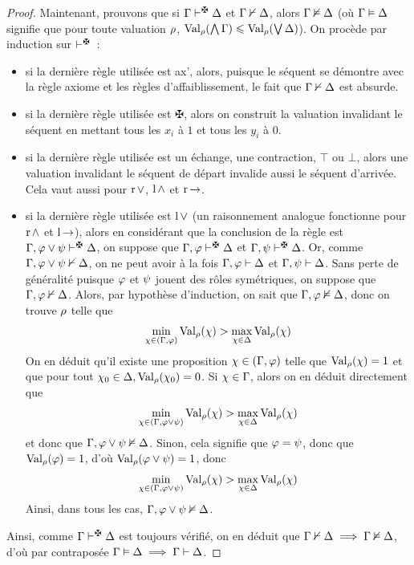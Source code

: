 \begin{proof}
  \noindent
  Maintenant, prouvons que si $\varCG\vdAbs\varCD$ et $\Gamma\nvdash\Delta$,
  alors $\Gamma\nvDash\Delta$ (où $\Gamma\vDash \Delta$ signifie que pour toute
  valuation
  $\rho$, $\operatorname{Val}_{\rho}(\bigwedge \Gamma) \leqslant \operatorname{Val}_{\rho}(\bigvee \Delta)$).
  On procède par induction sur $\vdAbs$~:
  \begin{itemize}
  \item si la dernière règle utilisée est ax', alors, puisque le séquent se
    démontre avec la règle axiome et les règles d'affaiblissement, le fait que
    $\Gamma\nvdash \Delta$ est absurde.
  \item si la dernière règle utilisée est $\maltese$, alors on
    construit la valuation invalidant le séquent en mettant tous les $x_i$ à
    $1$ et tous les $y_i$ à $0$.
  \item si la dernière règle utilisée est un échange, une contraction, $\top$
    ou $\bot$, alors une valuation invalidant le séquent de départ invalide
    aussi le séquent d'arrivée. Cela vaut aussi pour $\operatorname{r}\mathord{\lor}$,
    $\operatorname{l}\mathord{\land}$ et $\operatorname{r}\mathord{\to}$.
  \item si la dernière règle utilisée est $\operatorname{l}\mathord{\lor}$ (un raisonnement
    analogue fonctionne pour $\operatorname{r}\mathord{\land}$ et $\operatorname{l}\mathord{\to}$), alors
    en considérant que la conclusion de la règle est
    $\varCG, \varFF \lor \varFP \vdAbs \varCD$, on suppose que
    $\varCG, \varFF \vdAbs \varCD$ et $\varCG, \varFP \vdAbs \varCD$.
    Or, comme $\Gamma, \varphi\lor \psi\nvdash \Delta$,
    on ne peut avoir à la fois
    $\Gamma, \varphi \vdash \Delta$ et $\Gamma, \psi \vdash \Delta$. Sans perte de
    généralité puisque $\varphi$ et $\psi$ jouent des rôles symétriques,
    on suppose que
    $\Gamma, \varphi \nvdash \Delta$. Alors, par hypothèse d'induction, on sait que
    $\Gamma, \varphi \nvDash \Delta$, donc on trouve $\rho$ telle que
    \[\min_{\chi \in (\Gamma, \varphi)} \operatorname{Val}_{\rho}(\chi) >
    \max_{\chi \in \Delta} \operatorname{Val}_{\rho}(\chi)\]
    On en déduit qu'il existe une proposition $\chi \in (\Gamma, \varphi)$
    telle que
    $\operatorname{Val}_{\rho}(\chi) = 1$ et que pour tout
    $\chi_0\in \Delta, \operatorname{Val}_{\rho}(\chi_0) = 0$.
    Si $\chi \in \Gamma$, alors on en déduit directement que
    \[\min_{\chi\in (\Gamma, \varphi \lor \psi)} \operatorname{Val}_{\rho}(\chi) >
    \max_{\chi\in\Delta} \operatorname{Val}_{\rho}(\chi)\]
    et donc que $\Gamma, \varphi \lor \psi \nvDash \Delta$.
    Sinon, cela signifie que
    $\varphi = \psi$, donc que $\operatorname{Val}_{\rho}(\varphi) = 1$, d'où
    $\operatorname{Val}_{\rho}(\varphi\lor \psi) = 1$, donc
    \[\min_{\chi\in (\Gamma, \varphi \lor \psi)} \operatorname{Val}_{\rho}(\chi) >
    \max_{\chi\in\Delta} \operatorname{Val}_{\rho}(\chi)\]
    Ainsi, dans tous les cas, $\Gamma, \varphi \lor \psi \nvDash \Delta$.
  \end{itemize}

  Ainsi, comme $\varCG\vdAbs\varCD$ est toujours vérifié, on en déduit que
  $\Gamma\nvdash\Delta\implies\Gamma\nvDash\Delta$, d'où par contraposée
  $\Gamma\vDash\Delta\implies\Gamma\vdash\Delta$.
\end{proof}

